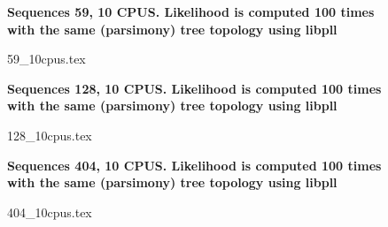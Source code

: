 \documentclass[12pt,a4paper]{article}
\begin{document}
\newcommand*{\figuretitle}[1]{%
    {\centering%
    \textbf{#1}%
    \par\medskip}%
}

\begin{figure}
\figuretitle{Sequences 59, 10 CPUS. Likelihood is computed 100 times with the same (parsimony) tree topology using libpll}
{59_10cpus.tex}
\end{figure}




\begin{figure}
\figuretitle{Sequences 128, 10 CPUS. Likelihood is computed 100 times with the same (parsimony) tree topology using libpll}
{128_10cpus.tex}
\end{figure}



\begin{figure}
\figuretitle{Sequences 404, 10 CPUS. Likelihood is computed 100 times with the same (parsimony) tree topology using libpll}
{404_10cpus.tex}
\end{figure}
\end{document}
